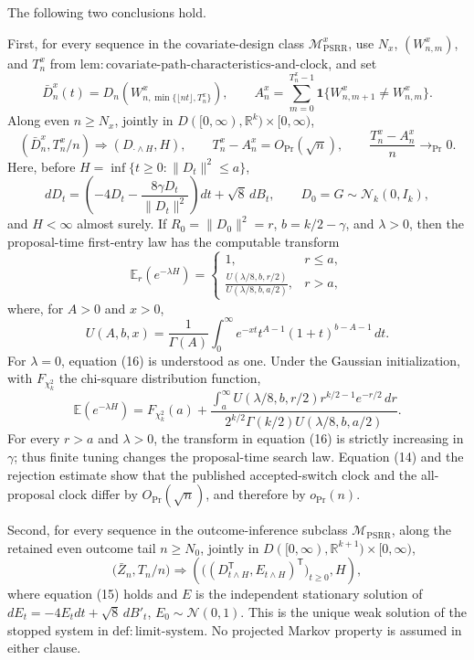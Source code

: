 The following two conclusions hold.

First, for every sequence in the covariate-design class \(\mathcal M_{\mathrm{PSRR}}^{x}\), use \(N_x\), \((W^x_{n,m})\), and \(T_n^x\) from \(\mathrm{lem{:}covariate\mbox{-}path\mbox{-}characteristics\mbox{-}and\mbox{-}clock}\), and set
\[
 \bar D_n^x(t)=D_n\!\left(W^x_{n,\min\{\lfloor nt\rfloor,T_n^x\}}\right),
 \qquad
 A_n^x=\sum_{m=0}^{T_n^x-1}\mathbf 1\{W^x_{n,m+1}\ne W^x_{n,m}\}.
\]
Along even \(n\ge N_x\), jointly in \(D([0,\infty),\mathbb R^k)\times[0,\infty)\),
\[
 (\bar D_n^x,T_n^x/n)\Rightarrow(D_{\cdot\wedge H},H),
 \qquad T_n^x-A_n^x=O_{\Pr}(\sqrt n),
 \qquad \frac{T_n^x-A_n^x}{n}\longrightarrow_{\Pr}0. \tag{14}
\]
Here, before \(H=\inf\{t\ge0:\|D_t\|^2\le a\}\),
\[
 dD_t=\left(-4D_t-\frac{8\gamma D_t}{\|D_t\|^2}\right)dt+\sqrt8\,dB_t,
 \qquad D_0=G\sim\mathcal N_k(0,I_k), \tag{15}
\]
and \(H<\infty\) almost surely. If \(R_0=\|D_0\|^2=r\), \(b=k/2-\gamma\), and \(\lambda>0\), then the proposal-time first-entry law has the computable transform
\[
 \mathbb E_r(e^{-\lambda H})=
 \begin{cases}
 1,&r\le a,\\[2mm]
 \displaystyle\frac{U(\lambda/8,b,r/2)}{U(\lambda/8,b,a/2)},&r>a,
 \end{cases} \tag{16}
\]
where, for \(A>0\) and \(x>0\),
\[
 U(A,b,x)=\frac1{\Gamma(A)}\int_0^\infty e^{-xt}t^{A-1}(1+t)^{b-A-1}\,dt. \tag{17}
\]
For \(\lambda=0\), equation (16) is understood as one. Under the Gaussian initialization, with \(F_{\chi_k^2}\) the chi-square distribution function,
\[
 \mathbb E(e^{-\lambda H})=F_{\chi_k^2}(a)+
 \frac{\displaystyle\int_a^\infty U(\lambda/8,b,r/2)r^{k/2-1}e^{-r/2}\,dr}
 {\displaystyle 2^{k/2}\Gamma(k/2)U(\lambda/8,b,a/2)}. \tag{18}
\]
For every \(r>a\) and \(\lambda>0\), the transform in equation (16) is strictly increasing in \(\gamma\); thus finite tuning changes the proposal-time search law. Equation (14) and the rejection estimate show that the published accepted-switch clock and the all-proposal clock differ by \(O_{\Pr}(\sqrt n)\), and therefore by \(o_{\Pr}(n)\).

Second, for every sequence in the outcome-inference subclass \(\mathcal M_{\mathrm{PSRR}}\), along the retained even outcome tail \(n\ge N_0\), jointly in \(D([0,\infty),\mathbb R^{k+1})\times[0,\infty)\),
\[
 \bigl(\bar Z_n,T_n/n\bigr)\Rightarrow
 \left(\bigl((D_{t\wedge H}^{\mathsf T},E_{t\wedge H})^{\mathsf T}\bigr)_{t\ge0},H\right), \tag{19}
\]
where equation (15) holds and \(E\) is the independent stationary solution of \(dE_t=-4E_tdt+\sqrt8\,dB'_t\), \(E_0\sim\mathcal N(0,1)\). This is the unique weak solution of the stopped system in \(\mathrm{def{:}limit\mbox{-}system}\). No projected Markov property is assumed in either clause.

